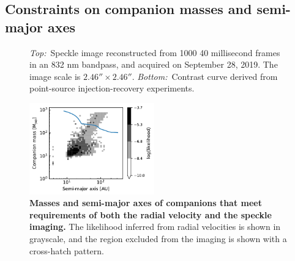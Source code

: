 \documentclass[12pt,twocolumn,tighten]{aastex62}
\begin{document}
\subsection{Constraints on companion masses and semi-major axes}

\begin{figure}[!t]
	\vspace{-1cm}
	\vspace{-0.7cm}
    \caption{
      {\it Top:\,} 
      Speckle image reconstructed from 1000 40 millisecond frames in
      an 832 nm bandpass, and acquired on September 28, 2019.  The
      image scale is $2.46''\times2.46''$.
      {\it Bottom:\,} 
      Contrast curve derived from point-source injection-recovery
      experiments.
    }
    \label{fig:zorro}
\end{figure}

\begin{figure}[t]
	\begin{center}
		\leavevmode
		\includegraphics[width=0.48\textwidth]{f4.pdf}
	\end{center}
	\vspace{-0.7cm}
	\caption{
    {\bf Masses and semi-major axes of companions that meet
    requirements of both the radial velocity and the speckle imaging.}
    The likelihood inferred from radial velocities is shown in
    grayscale, and the region excluded from the imaging is shown with
    a cross-hatch pattern.
	\label{fig:mass_sma}
  \vspace{-0.3cm}
	}
\end{figure}
\end{document}
